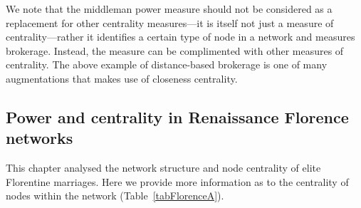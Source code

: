 \documentclass[11pt,fleqn]{article}
\begin{document}
\medskip\noindent We note that the middleman power measure should not be considered as a replacement for other centrality measures---it is itself not just a measure of centrality---rather it identifies a certain type of node in a network and measures brokerage. Instead, the measure can be complimented with other measures of centrality. The above example of distance-based brokerage is one of many augmentations that makes use of closeness centrality.

\subsection{Power and centrality in Renaissance Florence networks} 
\label{A}

This chapter analysed the network structure and node centrality of elite Florentine marriages. Here we provide more information as to the centrality of nodes within the network (Table~\ref{tabFlorenceA}).
\end{document}
